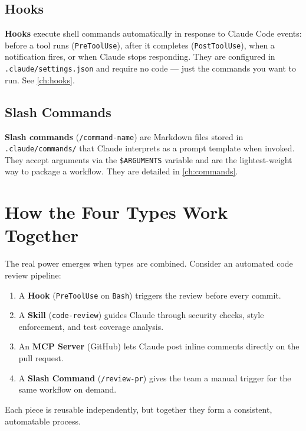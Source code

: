 \subsection{Hooks}

\textbf{Hooks} execute shell commands automatically in response to Claude Code
events: before a tool runs (\texttt{PreToolUse}), after it completes
(\texttt{PostToolUse}), when a notification fires, or when Claude stops
responding. They are configured in \texttt{.claude/settings.json} and require
no code — just the commands you want to run. See \cref{ch:hooks}.

\subsection{Slash Commands}

\textbf{Slash commands} (\texttt{/command-name}) are Markdown files stored in
\texttt{.claude/commands/} that Claude interprets as a prompt template when
invoked. They accept arguments via the \texttt{\$ARGUMENTS} variable and are
the lightest-weight way to package a workflow. They are detailed in
\cref{ch:commands}.

\section{How the Four Types Work Together}
\label{sec:plugin-synergy}

The real power emerges when types are combined. Consider an automated code
review pipeline:

\begin{enumerate}
  \item A \textbf{Hook} (\texttt{PreToolUse} on \texttt{Bash}) triggers the
        review before every commit.
  \item A \textbf{Skill} (\texttt{code-review}) guides Claude through security
        checks, style enforcement, and test coverage analysis.
  \item An \textbf{MCP Server} (GitHub) lets Claude post inline comments
        directly on the pull request.
  \item A \textbf{Slash Command} (\texttt{/review-pr}) gives the team a manual
        trigger for the same workflow on demand.
\end{enumerate}

Each piece is reusable independently, but together they form a consistent,
automatable process.

